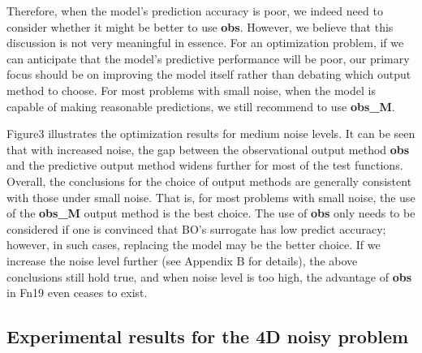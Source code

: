 \documentclass{article}
\begin{document}
\hspace{2em}Therefore, when the model's prediction accuracy is poor, we indeed need to consider whether it might be better to use \textbf{obs}. However, we believe that this discussion is not very meaningful in essence. For an optimization problem, if we can anticipate that the model's predictive performance will be poor, our primary focus should be on improving the model itself rather than debating which output method to choose. For most problems with small noise, when the model is capable of making reasonable predictions, we still recommend to use \textbf{obs\_M}.


\hspace{2em}Figure3 illustrates the optimization results for medium noise levels. It can be seen that with increased noise, the gap between the observational output method \textbf{obs} and the predictive output method widens further for most of the test functions. Overall, the conclusions for the choice of output methods are generally consistent with those under small noise. That is, for most problems with small noise, the use of the \textbf{obs\_M} output method is the best choice. The use of \textbf{obs} only needs to be considered if one is convinced that BO's surrogate has low predict accuracy; however, in such cases, replacing the model may be the better choice. If we increase the noise level further (see Appendix B for details), the above conclusions still hold true, and when noise level is too high, the advantage of \textbf{obs} in Fn19 even ceases to exist.

\subsection{Experimental results for the 4D noisy problem}
\end{document}
